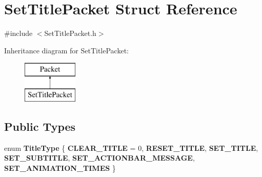 \hypertarget{struct_set_title_packet}{}\section{Set\+Title\+Packet Struct Reference}
\label{struct_set_title_packet}


{\ttfamily \#include $<$Set\+Title\+Packet.\+h$>$}

Inheritance diagram for Set\+Title\+Packet\+:\begin{figure}[H]
\begin{center}
\leavevmode
\includegraphics[height=2.000000cm]{struct_set_title_packet}
\end{center}
\end{figure}
\subsection*{Public Types}
\begin{DoxyCompactItemize}
\item 
\mbox{\label{struct_set_title_packet_a103cdd58e6f06752f9118f546dc748fb}} 
enum {\bfseries Title\+Type} \{ \newline
{\bfseries C\+L\+E\+A\+R\+\_\+\+T\+I\+T\+LE} = 0, 
{\bfseries R\+E\+S\+E\+T\+\_\+\+T\+I\+T\+LE}, 
{\bfseries S\+E\+T\+\_\+\+T\+I\+T\+LE}, 
{\bfseries S\+E\+T\+\_\+\+S\+U\+B\+T\+I\+T\+LE}, 
\newline
{\bfseries S\+E\+T\+\_\+\+A\+C\+T\+I\+O\+N\+B\+A\+R\+\_\+\+M\+E\+S\+S\+A\+GE}, 
{\bfseries S\+E\+T\+\_\+\+A\+N\+I\+M\+A\+T\+I\+O\+N\+\_\+\+T\+I\+M\+ES}
 \}
\end{DoxyCompactItemize}
